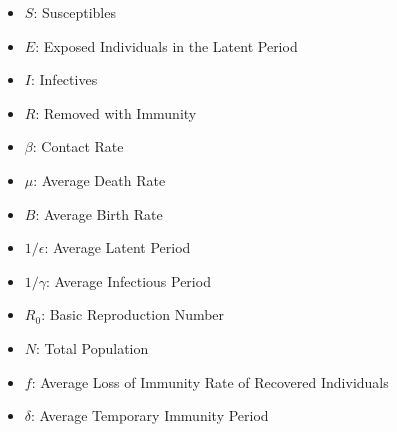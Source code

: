 \begin{itemize}
\item $S$: Susceptibles

\item $E$: Exposed Individuals in the Latent Period

\item $I$: Infectives

\item $R$: Removed with Immunity

\item $\beta$: Contact Rate

\item $\mu$: Average Death Rate

\item $B$: Average Birth Rate

\item $1/\epsilon$: Average Latent Period

\item $1/\gamma$: Average Infectious Period

\item $R_0$: Basic Reproduction Number

\item $N$: Total Population

\item $f$: Average Loss of Immunity Rate of Recovered Individuals

\item $\delta$: Average Temporary Immunity Period
\end{itemize}


